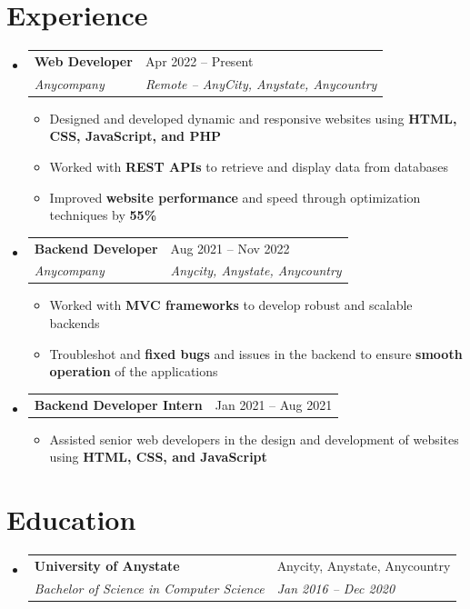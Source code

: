 \documentclass[a4paper,11pt]{article}
\makeatletter
\newcommand{\resumeItem}[1]{
  \item{\small #1\par}
}
\newcommand{\resumeItemListStart}{\begin{itemize}[rightmargin=0.11in, topsep=3pt, parsep=0pt, itemsep=2pt]}
\newcommand{\resumeItemListEnd}{\end{itemize}}
\newcommand{\resumeQuadHeading}[4]{
  \item{\small
    \begin{tabularx}{\linewidth}[t]{@{}>{\raggedright\arraybackslash}X@{\hspace{1em}}>{\raggedleft\arraybackslash}X@{}}
      \textbf{#1} & #2 \\
      \textit{#3} & \textit{#4} \\
    \end{tabularx}\par
  }
}
\newcommand{\resumeQuadHeadingChild}[2]{
  \item{\small
    \begin{tabularx}{\linewidth}[t]{@{}>{\raggedright\arraybackslash}X@{\hspace{1em}}>{\raggedleft\arraybackslash}X@{}}
      \textbf{#1} & #2 \\
    \end{tabularx}\par
  }
}
\newcommand{\resumeHeadingListStart}{
  \begin{itemize}[leftmargin=0.15in, label={}, topsep=4pt, parsep=0pt, itemsep=3pt]
}
\newcommand{\resumeHeadingListEnd}{\end{itemize}}
\makeatother
\begin{document}

\section{Experience}
\resumeHeadingListStart{}
  \resumeQuadHeading{Web Developer}{Apr 2022 -- Present}
  {Anycompany}{Remote -- AnyCity, Anystate, Anycountry}
    \resumeItemListStart{}
      \resumeItem{Designed and developed dynamic and responsive websites using \textbf{HTML, CSS, JavaScript, and PHP}}
      \resumeItem{Worked with \textbf{REST APIs} to retrieve and display data from databases}
      \resumeItem{Improved \textbf{website performance} and speed through optimization techniques by \textbf{55\%}}
    \resumeItemListEnd{}

  \resumeQuadHeading{Backend Developer}{Aug 2021 -- Nov 2022}
  {Anycompany}{Anycity, Anystate, Anycountry}
    \resumeItemListStart{}
      \resumeItem{Worked with \textbf{MVC frameworks} to develop robust and scalable backends}
      \resumeItem{Troubleshot and \textbf{fixed bugs} and issues in the backend to ensure \textbf{smooth operation} of the applications}
    \resumeItemListEnd{}

  \resumeQuadHeadingChild{Backend Developer Intern}{Jan 2021 -- Aug 2021}
    \resumeItemListStart{}
      \resumeItem{Assisted senior web developers in the design and development of websites using \textbf{HTML, CSS, and JavaScript}}
    \resumeItemListEnd{}
\resumeHeadingListEnd{}



\section{Education}
  \resumeHeadingListStart{}
    \resumeQuadHeading{University of Anystate}{Anycity, Anystate, Anycountry}
    {Bachelor of Science in Computer Science}{Jan 2016 -- Dec 2020}
  \resumeHeadingListEnd{}


\end{document}
